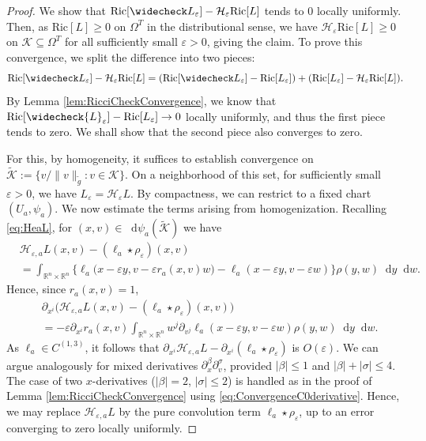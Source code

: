 \documentclass[a4paper,11pt]{article}
\numberwithin{equation}{section}
\theoremstyle{definition}
\theoremstyle{plain}
\newcommand{\R}{\mathbb R}
\newcommand{\eps}{\varepsilon}
\newcommand{\Ric}{\mathrm{Ric}}
\newcommand*\diff{\mathop{}\!\mathrm{d}}
\begin{document}
\begin{proof}
We show that $\Ric[\widecheck L_\eps] - \mathcal{H}_\eps \Ric[L]$ tends to $0$ locally uniformly.
Then, as $\Ric[L] \geq 0$ on $\Omega^T$ in the distributional sense, we have $\mathcal{H}_\eps \Ric[L]\geq 0$ on $\mathcal{K} \subseteq \Omega^T$ for all sufficiently small $\eps >0$, giving the claim. 
To prove this convergence, we split the difference into two pieces:
\begin{equation*}
    \Ric[\widecheck L_\eps] - \mathcal{H}_\eps \Ric[L]= (\Ric[\widecheck L_\eps] - \Ric[L_\eps]) + (\Ric[L_\eps]-\mathcal{H}_\eps \Ric[L]).
\end{equation*}
By Lemma \ref{lem:RicciCheckConvergence}, we know that $\Ric[\widecheck{L}_\eps] - \Ric[L_\eps] \rightarrow 0$ locally uniformly, and thus the first piece tends to zero.
We shall show that the second piece also converges to zero.

For this, by homogeneity, it suffices to establish convergence on $\widetilde{\mathcal{K}}:= \{v/\|v\|_{\tilde g} : v \in \mathcal{K}\}$.
On a neighborhood of this set, for sufficiently small $\eps>0$, we have $L_\eps = \mathcal{H}_\eps L$.
By compactness, we can restrict to a fixed chart $(U_a, \psi_a)$.
We now estimate the terms arising from homogenization.
Recalling \eqref{eq:HeaL}, for $(x,v) \in \diff\psi_a(\widetilde{\mathcal{K}})$ we have
\begin{align*}
&\mathcal{H}_{\eps,a} L(x,v) - (\ell_a \star \rho_\eps)(x,v) \\
&= \int_{\R^n \times \R^n} \bigl\{ \ell_a\bigl( x-\eps y,v-\eps r_a(x,v)w \bigr) -\ell_a(x-\eps y,v-\eps w)\bigr\} \rho(y,w) \diff y \diff w.
\end{align*}
Hence, since $r_a(x,v)=1$,
\begin{align*}
&\partial_{x^i} \bigl( \mathcal{H}_{\eps,a} L(x,v) - (\ell_a \star \rho_\eps)(x,v) \bigr) \\
&= -\eps \partial_{x^i}r_a(x,v) \int_{\R^n \times \R^n} w^j \partial_{v^j} \ell_a(x-\eps y, v - \eps w) \rho(y,w) \diff y \diff w.
\end{align*}
As $\ell_a \in C^{(1,3)}$, it follows that $\partial_{x^i} \mathcal{H}_{\eps,a} L - \partial_{x^i}(\ell_a \star \rho_\eps)$ is $O(\eps)$. 
We can argue analogously for mixed derivatives $\partial^{\beta}_x \partial^{\sigma}_v$, provided $|\beta| \leq 1$ and $|\beta| + |\sigma| \leq 4$.
The case of two $x$-derivatives ($|\beta| = 2$, $|\sigma| \leq 2$) is handled as in the proof of Lemma \ref{lem:RicciCheckConvergence} using \eqref{eq:ConvergenceC0derivative}.
Hence, we may replace $\mathcal H_{\eps,a}L$ by the pure convolution term $\ell_a\star\rho_\eps$, up to an error converging to zero locally uniformly.


\end{proof}
\end{document}
